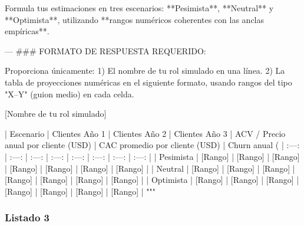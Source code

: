 \begin{APACode}
Formula tus estimaciones en tres escenarios: **Pesimista**, **Neutral** y **Optimista**, utilizando **rangos numéricos coherentes con las anclas empíricas**.

---
### FORMATO DE RESPUESTA REQUERIDO:

Proporciona únicamente:
1) El nombre de tu rol simulado en una línea.
2) La tabla de proyecciones numéricas en el siguiente formato, usando rangos del tipo "X–Y" (guion medio) en cada celda.

[Nombre de tu rol simulado]

| Escenario | Clientes Año 1 | Clientes Año 2 | Clientes Año 3 | ACV / Precio anual por cliente (USD) | CAC promedio por cliente (USD) | Churn anual (%
| :---: | :---: | :---: | :---: | :---: | :---: | :---: | :---: |
| Pesimista | [Rango] | [Rango] | [Rango] | [Rango] | [Rango] | [Rango] | [Rango] |
| Neutral | [Rango] | [Rango] | [Rango] | [Rango] | [Rango] | [Rango] | [Rango] |
| Optimista | [Rango] | [Rango] | [Rango] | [Rango] | [Rango] | [Rango] | [Rango] |
"""
\end{APACode}

\subsubsection{Listado 3}
\label{anexo:code-6-3-1-1-3}

